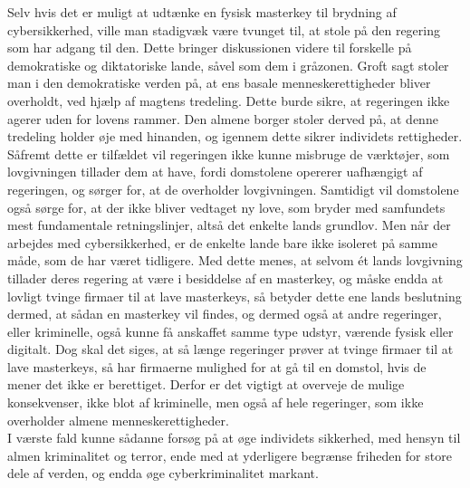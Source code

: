\noindent
Selv hvis det er muligt at udtænke en fysisk masterkey til brydning af cybersikkerhed, ville man stadigvæk være tvunget til, at stole på den regering som har adgang til den. Dette bringer diskussionen videre til forskelle på demokratiske og diktatoriske lande, såvel som dem i gråzonen. Groft sagt stoler man i den demokratiske verden på, at ens basale menneskerettigheder bliver overholdt, ved hjælp af magtens tredeling. Dette burde sikre, at regeringen ikke agerer uden for lovens rammer. Den almene borger stoler derved på, at denne tredeling holder øje med hinanden, og igennem dette sikrer individets rettigheder. Såfremt dette er tilfældet vil regeringen ikke kunne misbruge de værktøjer, som lovgivningen tillader dem at have, fordi domstolene opererer uafhængigt af regeringen, og sørger for, at de overholder lovgivningen. Samtidigt vil domstolene også sørge for, at der ikke bliver vedtaget ny love, som bryder med samfundets mest fundamentale retningslinjer, altså det enkelte lands grundlov. Men når der arbejdes med cybersikkerhed, er de enkelte lande bare ikke isoleret på samme måde, som de har været tidligere. Med dette menes, at selvom ét lands lovgivning tillader deres regering at være i besiddelse af en masterkey, og måske endda at lovligt tvinge firmaer til at lave masterkeys, så betyder dette ene lands beslutning dermed, at sådan en masterkey vil findes, og dermed også at andre regeringer, eller kriminelle, også kunne få anskaffet samme type udstyr, værende fysisk eller digitalt. Dog skal det siges, at så længe regeringer prøver at tvinge firmaer til at lave masterkeys, så har firmaerne mulighed for at gå til en domstol, hvis de mener det ikke er berettiget. Derfor er det vigtigt at overveje de mulige konsekvenser, ikke blot af kriminelle, men også af hele regeringer, som ikke overholder almene menneskerettigheder.\\
\noindent
I værste fald kunne sådanne forsøg på at øge individets sikkerhed, med hensyn til almen kriminalitet og terror, ende med at yderligere begrænse friheden for store dele af verden, og endda øge cyberkriminalitet markant.